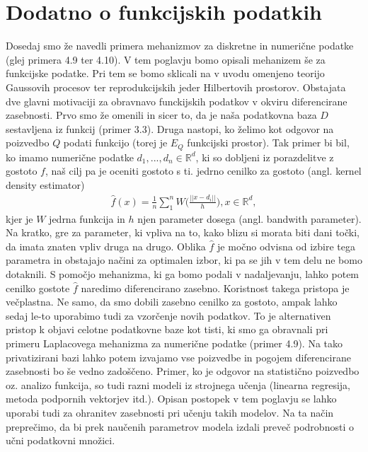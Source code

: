 \documentclass[12pt,a4paper]{amsart}
\theoremstyle{definition} %
\theoremstyle{plain} %
\begin{document}
\section{Dodatno o funkcijskih podatkih}
Dosedaj smo že navedli primera mehanizmov za diskretne in numerične podatke (glej primera 4.9 ter 4.10). V tem poglavju bomo opisali mehanizem še  za funkcijske podatke. Pri tem se bomo sklicali na v uvodu omenjeno teorijo Gaussovih procesov ter reprodukcijskih jeder Hilbertovih prostorov.
\newline
\newline
Obstajata dve glavni motivaciji za obravnavo funckijskih podatkov v okviru diferencirane zasebnosti. Prvo smo že omenili in sicer to, da je naša podatkovna baza $D$ sestavljena iz funkcij (primer 3.3). Druga nastopi, ko želimo kot odgovor na poizvedbo $Q$ podati funkcijo (torej je $E_Q$ funkcijski prostor). Tak primer bi bil, ko imamo numerične podatke $d_1, ..., d_n \in \mathbb{R}^d$, ki so dobljeni iz porazdelitve z gostoto $f$, naš cilj pa je oceniti gostoto s ti. jedrno cenilko za gostoto (angl. kernel density estimator) 
\begin{gather*}
\hat{f}(x)=\frac{1}{n}\sum_{1}^{n}W\Big(\frac{||x-d_i||}{h}\Big), x \in \mathbb{R}^d,
\end{gather*}
kjer je $W$ jedrna funkcija in $h$ njen parameter dosega (angl. bandwith parameter). Na kratko, gre za parameter, ki vpliva na to, kako blizu si morata biti dani točki, da imata znaten vpliv druga na drugo. Oblika $\hat{f}$ je močno odvisna od izbire tega parametra in obstajajo načini za optimalen izbor, ki pa se jih v tem delu ne bomo dotaknili. S pomočjo mehanizma, ki ga bomo podali v nadaljevanju, lahko potem cenilko gostote $\hat{f}$ naredimo diferencirano zasebno. Koristnost takega pristopa je večplastna. Ne samo, da smo dobili zasebno cenilko za gostoto, ampak lahko sedaj le-to uporabimo tudi za vzorčenje novih podatkov. To je alternativen pristop k objavi celotne podatkovne baze kot tisti, ki smo ga obravnali pri primeru Laplacovega mehanizma za numerične podatke (primer 4.9). Na tako privatizirani bazi lahko potem izvajamo vse poizvedbe in pogojem diferencirane zasebnosti bo še vedno zadoščeno. Primer, ko je odgovor na statistično poizvedbo oz. analizo funkcija, so tudi razni modeli iz strojnega učenja (linearna regresija, metoda podpornih vektorjev itd.). Opisan postopek v tem poglavju se lahko uporabi tudi za ohranitev zasebnosti pri učenju takih modelov. Na ta način preprečimo, da bi prek naučenih parametrov modela izdali preveč podrobnosti o učni podatkovni množici.
\end{document}
